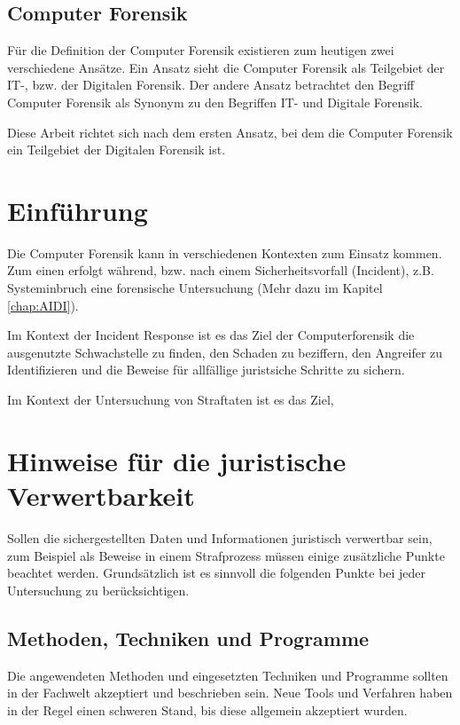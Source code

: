 \subsection{Computer Forensik}
Für die Definition der Computer Forensik existieren zum heutigen zwei verschiedene Ansätze. Ein Ansatz sieht die Computer Forensik als Teilgebiet der IT-, bzw. der Digitalen Forensik. Der andere Ansatz betrachtet den Begriff Computer Forensik als Synonym zu den Begriffen IT- und Digitale Forensik.

Diese Arbeit richtet sich nach dem ersten Ansatz, bei dem die Computer Forensik ein Teilgebiet der Digitalen Forensik ist.





\section{Einführung}
Die Computer Forensik kann in verschiedenen Kontexten zum Einsatz kommen. Zum einen erfolgt während, bzw. nach einem Sicherheitsvorfall (Incident), z.B. Systeminbruch eine forensische Untersuchung (Mehr dazu im Kapitel \ref{chap:AIDI}). 

Im Kontext der Incident Response ist es das Ziel der Computerforensik die ausgenutzte Schwachstelle zu finden, den Schaden zu beziffern, den Angreifer zu Identifizieren und die Beweise für allfällige juristsiche Schritte zu sichern.

Im Kontext der Untersuchung von Straftaten ist es das Ziel, 

\section{Hinweise für die juristische Verwertbarkeit}
Sollen die sichergestellten Daten und Informationen juristisch verwertbar sein, zum Beispiel als Beweise in einem Strafprozess müssen einige zusätzliche Punkte beachtet werden. Grundsätzlich ist es sinnvoll die folgenden Punkte bei jeder Untersuchung zu berücksichtigen.

\subsection{Methoden, Techniken und Programme}
Die angewendeten Methoden und eingesetzten Techniken und Programme sollten in der Fachwelt akzeptiert und beschrieben sein. Neue Tools und Verfahren haben in der Regel einen schweren Stand, bis diese allgemein akzeptiert wurden.

